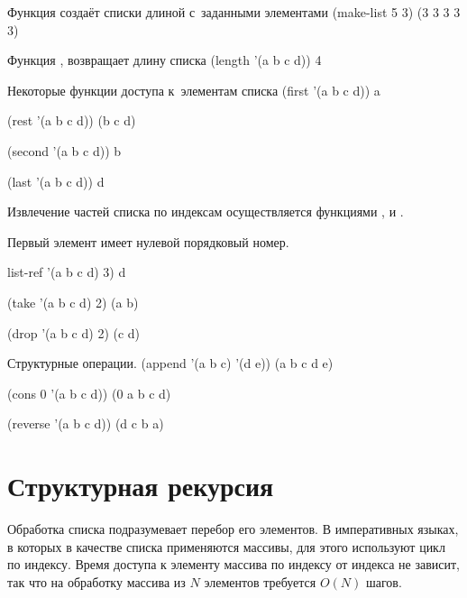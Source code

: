 \begin{example}{Функция  создаёт списки длиной  с~заданными  элементами }
\REPL
  {(make-list 5 3)}
  {(3 3 3 3 3)}
\end{example}

\begin{example}{Функция , возвращает длину списка }
\REPL
  {(length '(a b c d))}
  {4}
\end{example}

\begin{example}{Некоторые функции доступа к~элементам списка }
\REPL
  {(first '(a b c d))}
  {a}

\REPL
  {(rest '(a b c d))}
  {(b c d)}

\REPL
  {(second '(a b c d))}
  {b}

\REPL
  {(last '(a b c d))}
  {d}
\end{example}

\begin{example}{Извлечение частей списка по индексам осуществляется функциями ,  и .

Первый элемент имеет нулевой порядковый номер.}
\REPL
  {list-ref '(a b c d) 3)}
  {d}

\REPL
  {(take '(a b c d) 2)}
  {(a b)}

\REPL
  {(drop '(a b c d) 2)}
  {(c d)}
\end{example}

\begin{example}{Структурные операции.}
\REPL
  {(append '(a b c) '(d e))}
  {(a b c d e)}

\REPL
  {(cons 0 '(a b c d))}
  {(0 a b c d)}

\REPL
  {(reverse '(a b c d))}
  {(d c b a)}
\end{example}

\section{Структурная рекурсия}\label{struct-recursion}%
Обработка списка подразумевает перебор его элементов. В императивных языках, в которых в качестве списка применяются массивы, для этого используют цикл по индексу. Время доступа к элементу массива по индексу от индекса не зависит, так что на обработку массива из $N$ элементов требуется $O(N)$ шагов. 

